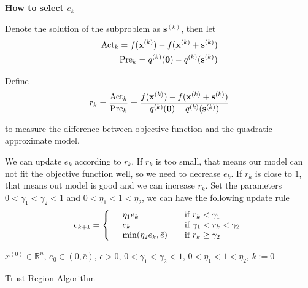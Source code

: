 \documentclass[runningheads]{llncs}
\begin{document}
\par
\noindent\textbf{How to select $e_k$}
\par
Denote the solution of the subproblem as $\mathbf{s}^{(k)}$,
then let
\begin{align}
    \textnormal{Act}_k = f(\mathbf{x}^{(k)}) - f(\mathbf{x}^{(k)} + \mathbf{s}^{(k)}) \\
    \textnormal{Pre}_k = q^{(k)}(\mathbf{0}) - q^{(k)}(\mathbf{s}^{(k)}) 
\end{align}

Define
\begin{align}
    r_k = \frac{\textnormal{Act}_k}{\textnormal{Pre}_k}
    = \frac{f(\mathbf{x}^{(k)}) - f(\mathbf{x}^{(k)} + \mathbf{s}^{(k)})}
    {q^{(k)}(\mathbf{0}) - q^{(k)}(\mathbf{s}^{(k)})}
\end{align}

to measure the difference between objective function
and the quadratic approximate model.
\par
We can update $e_k$ according to $r_k$. If $r_k$ is too small,
that means our model can not fit the objective function well,
so we need to decrease $e_k$. If $r_k$ is close to $1$,
that means out model is good and we can increase $r_k$.
Set the parameters $0 < \gamma_1 < \gamma_2 < 1$ and 
$0 < \eta_1 < 1 < \eta_2$, we can have the following update
rule
\begin{align}
    e_{k+1} = \left\{
        \begin{array}{lll}
            &\eta_1 e_k &\textnormal{if} \ r_k < \gamma_1 \\
            &e_k &\textnormal{if} \ \gamma_1 < r_k < \gamma_2 \\
            &\min(\eta_2 e_k, \bar{e}) \quad &\textnormal{if} \ r_k \geq \gamma_2
        \end{array}\right.
\end{align}

\begin{algorithm}[H]
    \SetAlgoLined
     $x^{(0)} \in \mathbb{R}^n$, $e_0 \in (0, \bar{e})$, $\epsilon > 0$,
     $0 < \gamma_1 < \gamma_2 < 1$, $0 < \eta_1 < 1 < \eta_2$, $k:= 0$\;
     \caption{Trust Region Algorithm}
\end{algorithm}
\end{document}
